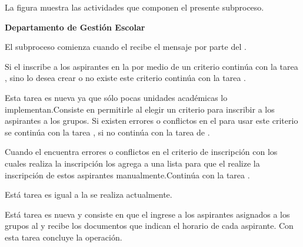 La figura  muestra las actividades que componen el presente subproceso.


\begin{PDescripcion}
	
	\Ppaso \textbf{Departamento de Gestión Escolar}
	
	\begin{enumerate}
		\Ppaso [\Einicio] El subproceso comienza cuando el  recibe el mensaje  por parte del .
		
		\Ppaso [\iCompuerta] Si el  inscribe a los aspirantes en la  por medio de un criterio continúa con la tarea , sino lo desea crear o no existe este criterio continúa con la tarea .
		
		\Ppaso [\itarea]  Esta tarea es nueva ya que sólo pocas unidades académicas lo implementan.Consiste en permitirle al  elegir un criterio para inscribir a los aspirantes a  los grupos. Si existen errores o conflictos en el  para usar este criterio se continúa con la tarea , si no continúa con la tarea de .
		
		\Ppaso [\itarea]  Cuando el  encuentra errores o conflictos en el criterio de inscripción con los cuales realiza la inscripción los agrega a una lista para que el  realize la inscripción de estos aspirantes manualmente.Continúa con la tarea .
		
		
		\Ppaso [\itarea]  Está tarea es igual a la se realiza actualmente.
		
		\Ppaso [\itarea]  Está tarea es nueva y consiste en que el  ingrese a los aspirantes asignados a los grupos al  y recibe los documentos que indican el horario de cada aspirante. Con esta tarea concluye la operación.
	\end{enumerate}
	
	
\end{PDescripcion}
